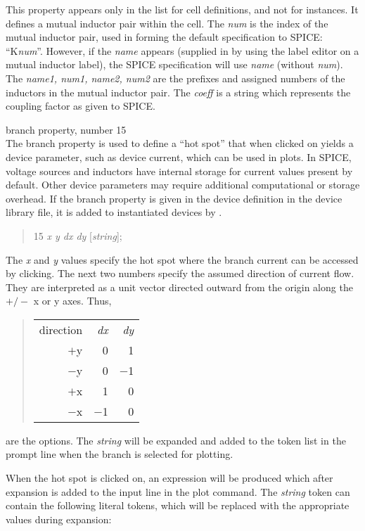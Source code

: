 \begin{description}
This property appears only in the list for cell definitions, and not
for instances.  It defines a mutual inductor pair within the cell. 
The {\it num} is the index of the mutual inductor pair, used in
forming the default specification to SPICE: ``{\vt K}{\it num\/}''. 
However, if the {\it name} appears (supplied in {\Xic} by using the
label editor on a mutual inductor label), the SPICE specification will
use {\it name\/} (without {\it num\/}).  The {\it name1, num1, name2,
num2} are the prefixes and assigned numbers of the inductors in the
mutual inductor pair.  The {\it coeff} is a string which represents
the coupling factor as given to SPICE.

\item{\et branch} property, number 15\\
The {\et branch} property is used to define a ``hot spot'' that when
clicked on yields a device parameter, such as device current, which
can be used in plots.  In SPICE, voltage sources and inductors have
internal storage for current values present by default.  Other device
parameters may require additional computational or storage overhead. 
If the {\et branch} property is given in the device definition in the
device library file, it is added to instantiated devices by {\Xic}.
\begin{quote} 15 {\it x y dx dy} [{\it string\/}];
\end{quote}

The {\it x} and {\it y} values specify the hot spot where the branch
current can be accessed by clicking.  The next two numbers specify the
assumed direction of current flow.  They are interpreted as a unit
vector directed outward from the origin along the $+/-$ x or y axes. 
Thus,
\begin{quote}
\begin{tabular}{rrr}
direction & \it dx & \it dy\\
$+$y &  0 & 1\\
$-$y &  0 & $-$1\\
$+$x &  1 & 0\\
$-$x & $-$1 & 0
\end{tabular}
\end{quote}
are the options.  The {\it string} will be expanded and added to
the token list in the prompt line when the branch is selected for
plotting.

When the hot spot is clicked on, an expression will be produced which
after expansion is added to the input line in the {\cb plot} command. 
The {\it string} token can contain the following literal tokens, which
will be replaced with the appropriate values during expansion:


\end{description}
